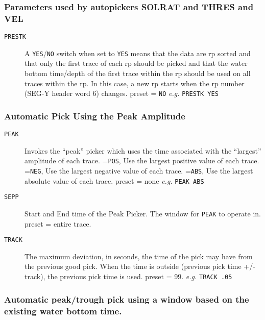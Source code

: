 \subsubsection{Parameters used by autopickers SOLRAT and THRES and VEL}

\begin{description}
\item[\texttt{PRESTK}] A \texttt{YES}/\texttt{NO} switch when set to \texttt{YES} means that the data are \gls{rp}
         sorted and that only the first trace of each \gls{rp} should be
         picked and that the water bottom time/depth of the first
         trace within the \gls{rp} should be used on all traces within
         the \gls{rp}.  In this case, a new \gls{rp} starts when the \gls{rp} number
         (SEG-Y header word 6) changes.
         \Gls{preset} = \texttt{NO}      \textit{e.g.}   \texttt{PRESTK YES}
\end{description}

\subsubsection{Automatic Pick Using the Peak Amplitude}

\begin{description}
\item[\texttt{PEAK}] Invokes the ``peak'' picker which uses the time associated with
         the ``largest'' amplitude of each trace.
       =\texttt{POS}, Use the largest positive value of each trace.
       =\texttt{NEG}, Use the largest negative value of each trace.
       =\texttt{ABS}, Use the largest absolute value of each trace.
        \Gls{preset} = none     \textit{e.g.}   \texttt{PEAK ABS}

\item[\texttt{SEPP}] Start and End time of the Peak Picker.  The window for
         \texttt{PEAK} to operate in.
         \Gls{preset} = entire trace.

\item[\texttt{TRACK}] The maximum deviation, in seconds, the time of the pick
         may have from the previous good pick.  When the time is
         outside (previous pick time +/- track), the previous
         pick time is used.
         \Gls{preset} = 99.    \textit{e.g.}  \texttt{TRACK .05}
\end{description}

\subsubsection[Automatic Peak/Trough Pick ]{Automatic peak/trough pick using a window based on the existing water bottom time.}

